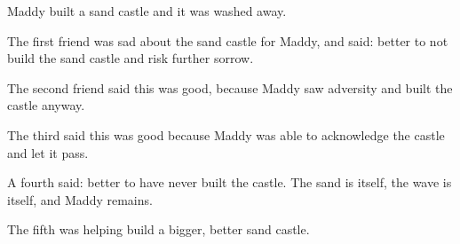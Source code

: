 Maddy built a sand castle and it was washed away.

The first friend was sad about the sand castle for Maddy, and said: better to not build the sand castle and risk further sorrow.

The second friend said this was good, because Maddy saw adversity and built the castle anyway.

The third said this was good because Maddy was able to acknowledge the castle and let it pass.

A fourth said: better to have never built the castle. The sand is itself, the wave is itself, and Maddy remains.

The fifth was helping build a bigger, better sand castle.
